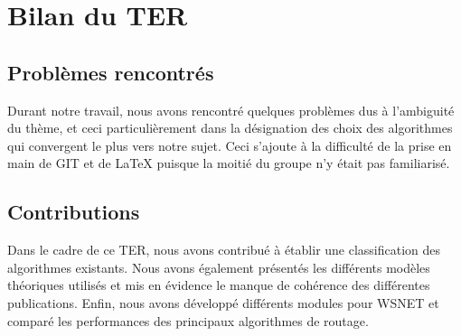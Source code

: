\section{Bilan du TER}

\subsection{Problèmes rencontrés}
Durant notre travail, nous avons rencontré quelques problèmes dus à l'ambiguité du thème, et ceci particulièrement
dans la désignation des choix des algorithmes qui convergent le plus vers notre sujet. Ceci s'ajoute à la difficulté 
de la prise en main de GIT et de \LaTeX{} puisque la moitié du groupe n'y était pas familiarisé.

\subsection{Contributions}
Dans le cadre de ce TER, nous avons contribué à établir une classification des algorithmes existants. Nous avons également présentés les différents modèles théoriques utilisés et mis en évidence le manque de cohérence des différentes publications. Enfin, nous avons développé différents modules pour WSNET et comparé les performances des principaux algorithmes de routage.





